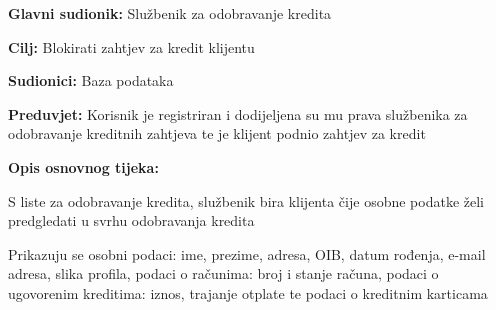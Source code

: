             
                 \noindent {}
                    \begin{packed_item}
                    
                      \item \textbf{Glavni sudionik: } Službenik za odobravanje kredita
                      \item  \textbf{Cilj:} Blokirati zahtjev za kredit klijentu
                      \item  \textbf{Sudionici:} Baza podataka
                      \item  \textbf{Preduvjet:} Korisnik je registriran i dodijeljena su mu prava službenika za odobravanje kreditnih zahtjeva te je klijent podnio zahtjev za kredit
                      \item  \textbf{Opis osnovnog tijeka:}
                      
                      \item[] \begin{packed_enum}
                    
                    \item S liste za odobravanje kredita, službenik bira klijenta čije osobne podatke želi predgledati u svrhu odobravanja kredita
                    \item Prikazuju se osobni podaci: ime, prezime, adresa, OIB, datum rođenja, e-mail adresa, slika profila, podaci o računima: broj i stanje računa, podaci o ugovorenim kreditima: iznos, trajanje otplate te podaci o kreditnim karticama
                    
                    
                  \end{packed_enum}
                \end{packed_item}
                
           
        			
